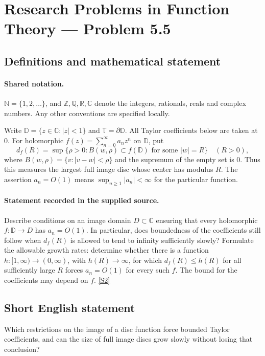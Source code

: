 \documentclass[11pt]{article}
\newcommand{\sref}[2]{\hyperlink{source:#1:#2}{[S#2]}}
\begin{document}
\section{Research Problems in Function Theory — Problem 5.5}\label{statement}

\subsection{Definitions and mathematical statement}

\paragraph{Shared notation.}$\mathbb N=\{1,2,\ldots\}$, and $\mathbb Z,\mathbb Q,\mathbb R,\mathbb C$ denote the integers, rationals, reals and complex numbers. Any other conventions are specified locally.


Write $\mathbb D=\{z\in\mathbb C:|z|<1\}$ and $\mathbb T=\partial\mathbb D$. All Taylor coefficients below are taken at $0$. For holomorphic $f(z)=\sum_{n=0}^\infty a_nz^n$ on $\mathbb D$, put
\[d_f(R)=\sup\{\rho>0:B(w,\rho)\subset f(\mathbb D)\text{ for some }|w|=R\}\quad(R>0),\]
where $B(w,\rho)=\{v:|v-w|<\rho\}$ and the supremum of the empty set is $0$. Thus this measures the largest full image disc whose center has modulus $R$. The assertion $a_n=O(1)$ means $\sup_{n\ge1}|a_n|<\infty$ for the particular function.
\paragraph{Statement recorded in the supplied source.}
Describe conditions on an image domain $D\subset\mathbb C$ ensuring that every holomorphic $f:\mathbb D\to D$ has $a_n=O(1)$. In particular, does boundedness of the coefficients still follow when $d_f(R)$ is allowed to tend to infinity sufficiently slowly? Formulate the allowable growth rates: determine whether there is a function $h:[1,\infty)\to(0,\infty)$, with $h(R)\to\infty$, for which $d_f(R)\le h(R)$ for all sufficiently large $R$ forces $a_n=O(1)$ for every such $f$. The bound for the coefficients may depend on $f$. \sref{statement}{2}
\subsection{Short English statement}
Which restrictions on the image of a disc function force bounded Taylor coefficients, and can the size of full image discs grow slowly without losing that conclusion?
\end{document}
